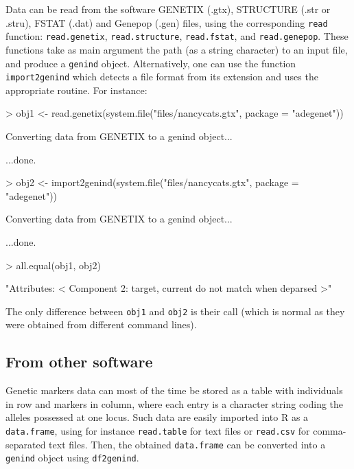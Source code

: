 \documentclass{article}
\begin{document}
Data can be read from the software GENETIX (.gtx), STRUCTURE (.str or
.stru), FSTAT (.dat) and Genepop (.gen) files, using the corresponding
\texttt{read} function: \texttt{read.genetix},  \texttt{read.structure},
\texttt{read.fstat}, and  \texttt{read.genepop}.
These functions take as main argument the path (as a string character) to an input file, and produce a \texttt{genind} object.
Alternatively, one can use the function \texttt{import2genind} which detects a file format from its extension and uses the appropriate routine.
For instance:
\begin{Schunk}
\begin{Sinput}
> obj1 <- read.genetix(system.file("files/nancycats.gtx", package = "adegenet"))
\end{Sinput}
\begin{Soutput}
 Converting data from GENETIX to a genind object... 

...done.
\end{Soutput}
\begin{Sinput}
> obj2 <- import2genind(system.file("files/nancycats.gtx", package = "adegenet"))
\end{Sinput}
\begin{Soutput}
 Converting data from GENETIX to a genind object... 

...done.
\end{Soutput}
\begin{Sinput}
> all.equal(obj1, obj2)
\end{Sinput}
\begin{Soutput}
[1] "Attributes: < Component 2: target, current do not match when deparsed >"
\end{Soutput}
\end{Schunk}

\noindent The only difference between \texttt{obj1} and \texttt{obj2} is
their call (which is normal as they were obtained from different
command lines).


\subsection{From other software}
Genetic markers data can most of the time be stored as a table with individuals in row and markers
in column, where each entry is a character string coding the alleles possessed at one locus.
Such data are easily imported into R as a \texttt{data.frame}, using for instance \texttt{read.table}
for text files or \texttt{read.csv} for comma-separated text files.
Then, the obtained \texttt{data.frame} can be converted into a \texttt{genind} object using \texttt{df2genind}.
\end{document}

